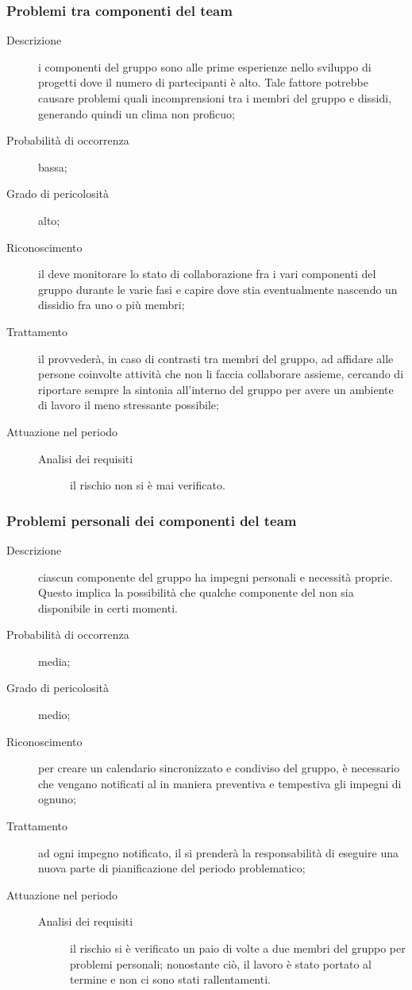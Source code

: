 		\subsubsection{Problemi tra componenti del team}
		\begin{description}
			\item[Descrizione] i componenti del gruppo sono alle prime esperienze nello sviluppo di progetti dove il numero di partecipanti è alto. Tale fattore potrebbe causare problemi quali incomprensioni tra i membri del gruppo e dissidi, generando quindi un clima non proficuo;
			\item[Probabilità di occorrenza] bassa;
			\item[Grado di pericolosità] alto;
			\item[Riconoscimento] il \R{} deve monitorare lo stato di collaborazione fra i vari componenti del gruppo durante le varie fasi e capire dove stia eventualmente nascendo un dissidio fra uno o più membri;
			\item[Trattamento] il \R{} provvederà, in caso di contrasti tra membri del gruppo, ad affidare alle persone coinvolte attività che non li faccia collaborare assieme, cercando di riportare sempre la sintonia all'interno del gruppo per avere un ambiente di lavoro il meno stressante possibile;
			\item[Attuazione nel periodo]
			\begin{description}
				\item[Analisi dei requisiti] il rischio non si è mai verificato.
			\end{description}
		\end{description}
		\subsubsection{Problemi personali dei componenti del team}
		\begin{description}
			\item[Descrizione] ciascun componente del gruppo ha impegni personali e necessità proprie. Questo implica la possibilità che qualche componente del  non sia disponibile in certi momenti.
			\item[Probabilità di occorrenza] media;
			\item[Grado di pericolosità] medio;
			\item[Riconoscimento] per creare un calendario sincronizzato e condiviso del gruppo, è necessario che vengano notificati al \R{} in maniera preventiva e tempestiva gli impegni di ognuno;
			\item[Trattamento] ad ogni impegno notificato, il \R{} si prenderà la responsabilità di eseguire una nuova parte di pianificazione del periodo problematico; 
			\item[Attuazione nel periodo]
			\begin{description}
				\item[Analisi dei requisiti] il rischio si è verificato un paio di volte a due membri del gruppo per problemi personali; nonostante ciò, il lavoro è stato portato al termine e non ci sono stati rallentamenti.
			\end{description}
		\end{description}
